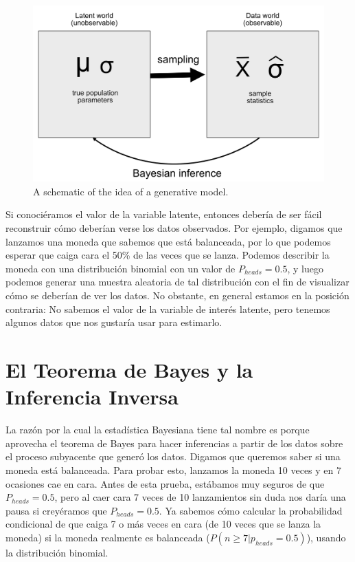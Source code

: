 \documentclass[
  12pt,
]{book}
\begin{document}
\begin{figure}
\includegraphics[width=0.8\linewidth]{images/BayesianInference} \caption{A schematic of the idea of a generative model.}\label{fig:GenerativeModel}
\end{figure}

Si conociéramos el valor de la variable latente, entonces debería de ser fácil reconstruir cómo deberían verse los datos observados. Por ejemplo, digamos que lanzamos una moneda que sabemos que está balanceada, por lo que podemos esperar que caiga cara el 50\% de las veces que se lanza. Podemos describir la moneda con una distribución binomial con un valor de \(P_{heads}=0.5\), y luego podemos generar una muestra aleatoria de tal distribución con el fin de visualizar cómo se deberían de ver los datos. No obstante, en general estamos en la posición contraria: No sabemos el valor de la variable de interés latente, pero tenemos algunos datos que nos gustaría usar para estimarlo.

\hypertarget{el-teorema-de-bayes-y-la-inferencia-inversa}{%
\section{El Teorema de Bayes y la Inferencia Inversa}\label{el-teorema-de-bayes-y-la-inferencia-inversa}}

La razón por la cual la estadística Bayesiana tiene tal nombre es porque aprovecha el teorema de Bayes para hacer inferencias a partir de los datos sobre el proceso subyacente que generó los datos. Digamos que queremos saber si una moneda está balanceada. Para probar esto, lanzamos la moneda 10 veces y en 7 ocasiones cae en cara. Antes de esta prueba, estábamos muy seguros de que \(P_{heads}=0.5\), pero al caer cara 7 veces de 10 lanzamientos sin duda nos daría una pausa si creyéramos que \(P_{heads}=0.5\). Ya sabemos cómo calcular la probabilidad condicional de que caiga 7 o más veces en cara (de 10 veces que se lanza la moneda) si la moneda realmente es balanceada (\(P(n\ge7|p_{heads}=0.5)\)), usando la distribución binomial.
\end{document}
